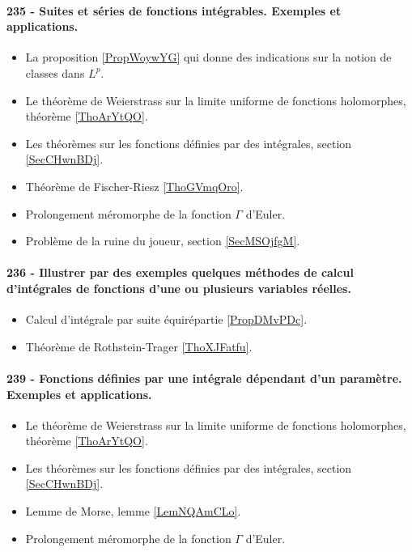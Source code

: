 \paragraph{235 - Suites et séries de fonctions intégrables. Exemples et applications.}
\begin{itemize}
    \item La proposition \ref{PropWoywYG} qui donne des indications sur la notion de classes dans \( L^p\).
    \item Le théorème de Weierstrass sur la limite uniforme de fonctions holomorphes, théorème \ref{ThoArYtQO}.
    \item Les théorèmes sur les fonctions définies par des intégrales, section \ref{SecCHwnBDj}.
    \item Théorème de Fischer-Riesz \ref{ThoGVmqOro}.
    \item Prolongement méromorphe de la fonction \( \Gamma\) d'Euler.
    \item Problème de la ruine du joueur, section \ref{SecMSOjfgM}.
\end{itemize}
\paragraph{236 - Illustrer par des exemples quelques méthodes de calcul d’intégrales de fonctions d’une ou plusieurs variables réelles.}
\begin{itemize}
    \item Calcul d'intégrale par suite équirépartie \ref{PropDMvPDc}.
    \item Théorème de Rothstein-Trager \ref{ThoXJFatfu}.
\end{itemize}
\paragraph{239 - Fonctions définies par une intégrale dépendant d’un paramètre. Exemples et applications.}
\begin{itemize}
    \item Le théorème de Weierstrass sur la limite uniforme de fonctions holomorphes, théorème \ref{ThoArYtQO}.
    \item Les théorèmes sur les fonctions définies par des intégrales, section \ref{SecCHwnBDj}.
    \item Lemme de Morse, lemme \ref{LemNQAmCLo}.
    \item Prolongement méromorphe de la fonction \( \Gamma\) d'Euler.
\end{itemize}

